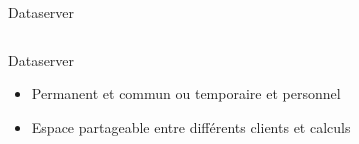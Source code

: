 \documentclass{beamer}
\begin{document}
\begin{frame}{Dataserver}
\begin{columns}
\begin{column}[r]{0.5\linewidth}
\begin{exampleblock}{Dataserver}
\begin{itemize}
             \item Permanent et commun ou temporaire et personnel
             \item Espace partageable entre différents clients et calculs
            \end{itemize}
            
        \end{exampleblock}
        
	\end{column}
	\end{columns}
    
\end{frame}
\end{document}
